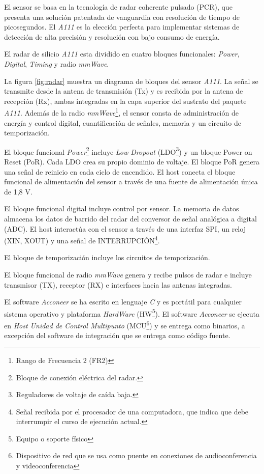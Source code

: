 El sensor se basa en la tecnología de radar coherente pulsado (PCR), que presenta una solución patentada de vanguardia con resolución de tiempo de picosegundos. El \textit{A111} es la elección perfecta para implementar sistemas de detección de alta precisión y resolución con bajo consumo de energía.

El radar de silicio \textit{A111} esta dividido en cuatro bloques funcionales: \textit{Power}, \textit{Digital}, \textit{Timing} y radio \textit{mmWave}.


La figura \ref{fig:radar} muestra un diagrama de bloques del sensor \textit{A111}. La señal se transmite desde la antena de transmisión (Tx) y es recibida por la antena de recepción (Rx), ambas integradas en la capa superior del sustrato del paquete \textit{A111}. Además de la radio \textit{mmWave}\footnote{Rango de Frecuencia 2 (FR2)}, el sensor consta de administración de energía y control digital, cuantificación de señales, memoria y un circuito de temporización.

El bloque funcional \textit{Power}\footnote{Bloque de conexión eléctrica del radar.} incluye \textit{Low Dropout} (LDO\footnote{Reguladores de voltaje de caída baja.}) y un bloque Power on Reset (PoR). Cada LDO crea su propio dominio de voltaje. El bloque PoR genera una señal de reinicio en cada ciclo de encendido. El host conecta el bloque funcional de alimentación del sensor a través de una fuente de alimentación única de 1,8 V.

El bloque funcional digital incluye control por sensor. La memoria de datos almacena los datos de barrido del radar del conversor de señal analógica a digital (ADC). El host interactúa con el sensor a través de una interfaz SPI, un reloj (XIN, XOUT) y una señal de INTERRUPCIÓN\footnote{Señal recibida por el procesador de una computadora, que indica que debe interrumpir el curso de ejecución actual. }.

El bloque de temporización incluye los circuitos de temporización.

El bloque funcional de radio \textit{mmWave} genera y recibe pulsos de radar e incluye transmisor (TX), receptor (RX) e interfaces hacia las antenas integradas.

El software \textit{Acconeer} se ha escrito en lenguaje \textit{C} y es portátil para cualquier sistema operativo y plataforma \textit{HardWare} (HW\footnote{Equipo o soporte físico}). El software \textit{Acconeer} se ejecuta en \textit{Host Unidad de Control Multipunto} (MCU\footnote{Dispositivo de red que se usa como puente en conexiones de audioconferencia y videoconferencia}) y se entrega como binarios, a excepción del software de integración que se entrega como código fuente.

